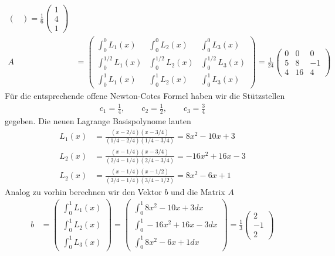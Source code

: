 \begin{solution}
\begin{align*}
\begin{pmatrix}
  \end{pmatrix}
  = \frac{1}{6}\begin{pmatrix}
    1 \\ 4 \\ 1
  \end{pmatrix} \\
  A &= \begin{pmatrix}
    \int_0^0 L_1(x) & \int_0^0 L_2(x) & \int_0^0 L_3(x)\\
    \int_0^{1/2} L_1(x) & \int_0^{1/2} L_2(x) & \int_0^{1/2} L_3(x)\\
    \int_0^1 L_1(x) & \int_0^1 L_2(x) & \int_0^1 L_3(x)
  \end{pmatrix}
  = \frac{1}{24}\begin{pmatrix}
    0 & 0 & 0\\
    5 & 8 & -1\\
    4 & 16 & 4
  \end{pmatrix}
\end{align*}
Für die entsprechende offene Newton-Cotes Formel haben wir die Stützstellen
\begin{align*}
  c_1 = \frac{1}{4}, \qquad c_2 = \frac{1}{2}, \qquad c_3 = \frac{3}{4}
\end{align*}
gegeben. Die neuen Lagrange Basispolynome lauten
\begin{align*}
  L_1(x) &= \frac{(x - 2/4)(x - 3/4)}{(1/4-2/4)(1/4-3/4)} = 8x^2 - 10x + 3 \\
  L_2(x) &= \frac{(x - 1/4)(x - 3/4)}{(2/4-1/4)(2/4-3/4)} = -16x^2 + 16x - 3 \\
  L_2(x) &= \frac{(x - 1/4)(x - 1/2)}{(3/4-1/4)(3/4-1/2)} = 8x^2 - 6x + 1
\end{align*}
Analog zu vorhin berechnen wir den Vektor $b$ und die Matrix $A$
\begin{align*}
b &= \begin{pmatrix}
  \int_0^1 L_1(x) \\ \int_0^1 L_2(x) \\ \int_0^1 L_3(x)
\end{pmatrix}
= \begin{pmatrix}
  \int_0^1 8x^2 - 10x + 3 dx \\
  \int_0^1 -16x^2 + 16x - 3 dx \\
  \int_0^1 8x^2 - 6x + 1 dx
\end{pmatrix}
= \frac{1}{3}\begin{pmatrix}
  2 \\ -1 \\ 2
\end{pmatrix} \\

\end{align*}
\end{solution}
